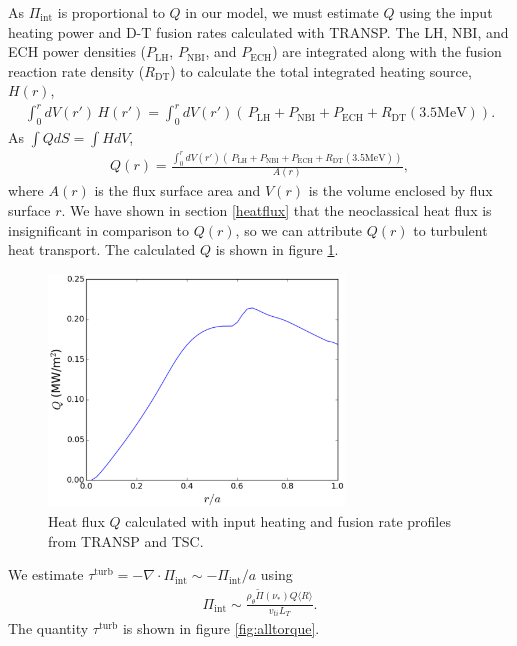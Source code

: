 \documentclass[aip, pop, preprint]{revtex4-1}
\begin{document}
As $\Pi_{\mathrm{int}}$ is proportional to $Q$ in our model, we must estimate $Q$ using the input heating power and D-T fusion rates calculated with TRANSP. The LH, NBI, and ECH power densities ($P_{\mathrm{LH}}$, $P_{\mathrm{NBI}}$, and $P_{\mathrm{ECH}}$) are integrated along with the fusion reaction rate density ($R_{\mathrm{DT}}$) to calculate the total integrated heating source, $H(r)$,
\begin{gather}
\int_0^r dV(r') \, H(r') = \int_0^r dV(r') \left(\, P_{\mathrm{LH}} + P_{\mathrm{NBI}} + P_{\mathrm{ECH}} + R_{\mathrm{DT}} (3.5 \mathrm{MeV}) \right).
\end{gather}
As $\int Q dS = \int H dV$, 
\begin{gather}
Q(r) = \frac{\int_0^{r} dV(r') \left(\, P_{\mathrm{LH}} + P_{\mathrm{NBI}} + P_{\mathrm{ECH}} + R_{\mathrm{DT}} (3.5 \mathrm{MeV}) \right)}{A(r)},
\end{gather}
where $A(r)$ is the flux surface area and $V(r)$ is the volume enclosed by flux surface $r$. We have shown in section \ref{heatflux} that the neoclassical heat flux is insignificant in comparison to $Q(r)$, so we can attribute $Q(r)$ to turbulent heat transport. The calculated $Q$ is shown in figure \ref{fig:turbHeatFlux}.

\begin{figure}[h!]
\centering
\includegraphics[width=0.7\textwidth]{figure14.eps}
\caption{\label{fig:turbHeatFlux} Heat flux $Q$ calculated with input heating and fusion rate profiles from TRANSP and TSC.}
\end{figure}

We estimate $\tau^{\mathrm{turb}} = - \nabla \cdot \Pi_{\mathrm{int}} \sim -\Pi_{\mathrm{int}}/a$ using 
\begin{gather}
\Pi_{\mathrm{int}} \sim \frac{\rho_{\theta} \widetilde{\Pi}(\nu_*) Q \langle R \rangle}{v_{ti} L_T}.
\end{gather}
The quantity $\tau^{\mathrm{turb}}$ is shown in figure \ref{fig:alltorque}.
\end{document}
